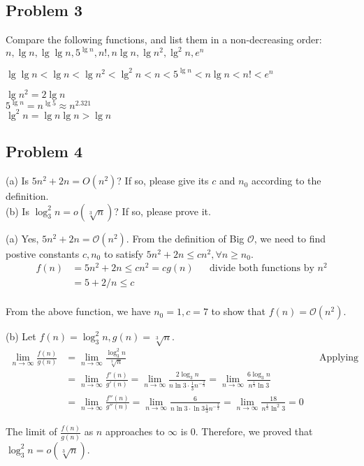 \documentclass[a4paper]{article}
\makeatletter
\newenvironment{solution}
  {\begin{proof}[Solution]}
  {\end{proof}}
\renewenvironment{proof}[1][\proofname]{%
  \par\pushQED{\qed}\normalfont%
  \topsep6\p@\@plus6\p@\relax
  \trivlist\item[\hskip\labelsep\bfseries#1\@addpunct{.}]%
  \ignorespaces
}{%
  \popQED\endtrivlist\@endpefalse
}
\makeatother
\begin{document}
\subsection*{Problem 3}
Compare the following functions, and list them in a non-decreasing order: \\
$n, \lg n, \lg \lg n, 5^{\lg n}, n!, n \lg n, \lg n^2, \lg^2 n, e^n$
\begin{solution}
  $\lg\lg n < \lg n < \lg n^2 < \lg^2 n< n < 5^{\lg n} < n \lg n < n! < e^n$

 $\lg n^2 = 2\lg n$ \\
 $5^{\lg n} = n^{\lg 5} \approx n^{2.321}$ \\
 $\lg^2 n = \lg n \lg n > \lg n$
\end{solution}

\subsection*{Problem 4}
(a) Is $5n^2+2n =O(n^2)$? If so, please give its $c$ and $n_0$ according to the definition. \\
(b) Is $\log_3^2 n =o(\sqrt[3]n)$? If so, please prove it.
\begin{solution}
  (a) Yes, $5n^2 + 2n = \mathcal{O}(n^2)$. From the definition of Big $\mathcal{O}$, we need to find postive constants $c, n_0$ to satisfy $5n^2 + 2n \le cn^2, \forall n \ge n_0$.
  \begin{align*}
    f(n) &= 5n^2 + 2n \le cn^ 2 = cg(n) && \text{divide both functions by $n^2$}\\
        &= 5 + 2/n \le c \\
  \end{align*}

  From the above function, we have $n_0 = 1, c = 7$ to show that $f(n) = \mathcal{O}(n^2)$.
\end{solution}

\begin{solution}
  (b) Let $f(n) = \log_3^2 n, g(n) = \sqrt[3]{n}$.
  \begin{align*}
    \lim\limits_{n \to \infty}\frac{f(n)}{g(n)} &= \lim\limits_{n \to \infty}\frac{\log_3^2 n}{\sqrt[3]n} && \text{Applying L'Hospital's Rule} \\
                                                &= \lim\limits_{n \to \infty}\frac{f'(n)}{g'(n)} =  \lim\limits_{n \to \infty}\frac{2\log_3 n}{n \ln 3 \cdot \frac{1}{3} n^{-\frac{2}{3}}} = \lim\limits_{n \to \infty}\frac{6 \log_3 n}{n^{\frac{1}{3}} \ln 3}\\
                                                &= \lim\limits_{n \to \infty}\frac{f''(n)}{g''(n)} =\lim\limits_{n \to \infty}\frac{6}{n \ln 3 \cdot \ln 3 \frac{1}{3} n^{-\frac{2}{3}}} = \lim\limits_{n \to \infty}\frac{18}{n^{\frac{1}{3}} \ln^2 3} = 0
  \end{align*}

  The limit of $\frac{f(n)}{g(n)}$ as $n$ approaches to $\infty$ is $0$. Therefore, we proved that $\log_3^2 n = o(\sqrt[3]{n})$.
\end{solution}
\end{document}
